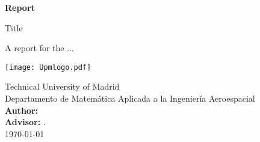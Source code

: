 \begin{titlepage}
	\begin{center}
		\vspace*{3cm}
		\huge
		\textbf{Report}
		
		\vspace{0.5cm}
		\huge
		Title
		
		\vspace{1cm}
		\Large
		
		A report for the ...\\
		\vspace{0.5cm}
		
		\texttt{[image: Upmlogo.pdf]}
		
		
		\vspace{0.8cm}
		\Large
		Technical University of Madrid\\
		Departamento de Matemática Aplicada a la Ingeniería Aeroespacial\\
		\vspace{0.8cm}
		\large
		\textbf{Author:} \\
		
		\textbf{Advisor:} .\\
		\vspace{0.3cm}
		\centering
		\today
		
		
		
	\end{center}
\end{titlepage}